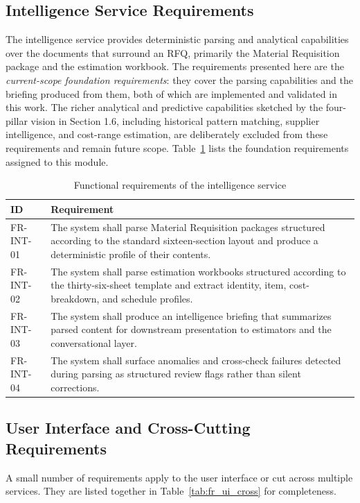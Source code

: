 \subsection*{Intelligence Service Requirements}
The intelligence service provides deterministic parsing and analytical capabilities over the documents that surround an RFQ, primarily the Material Requisition package and the estimation workbook. The requirements presented here are the \textit{current-scope foundation requirements}: they cover the parsing capabilities and the briefing produced from them, both of which are implemented and validated in this work. The richer analytical and predictive capabilities sketched by the four-pillar vision in Section 1.6, including historical pattern matching, supplier intelligence, and cost-range estimation, are deliberately excluded from these requirements and remain future scope. Table~\ref{tab:fr_intelligence} lists the foundation requirements assigned to this module.

\begin{table}[H]
\centering
\renewcommand{\arraystretch}{1.3}
\begin{tabular}{|p{1.8cm}|p{12cm}|}
\hline
\rowcolor{lightgray}
\textbf{ID} & \textbf{Requirement} \\ \hline
FR-INT-01 & The system shall parse Material Requisition packages structured according to the standard sixteen-section layout and produce a deterministic profile of their contents. \\ \hline
FR-INT-02 & The system shall parse estimation workbooks structured according to the thirty-six-sheet template and extract identity, item, cost-breakdown, and schedule profiles. \\ \hline
FR-INT-03 & The system shall produce an intelligence briefing that summarizes parsed content for downstream presentation to estimators and the conversational layer. \\ \hline
FR-INT-04 & The system shall surface anomalies and cross-check failures detected during parsing as structured review flags rather than silent corrections. \\ \hline
\end{tabular}
\caption{Functional requirements of the intelligence service}
\label{tab:fr_intelligence}
\end{table}

\subsection*{User Interface and Cross-Cutting Requirements}
A small number of requirements apply to the user interface or cut across multiple services. They are listed together in Table~\ref{tab:fr_ui_cross} for completeness.

